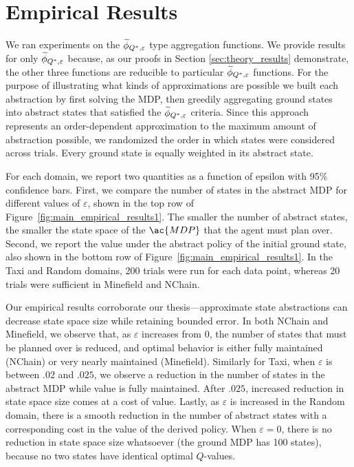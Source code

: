 \section{Empirical Results}

We ran experiments on the $\widetilde \phi_{Q^*,\varepsilon}$ type aggregation functions. We provide results for only $\widetilde \phi_{Q^*,\varepsilon}$ because, as our proofs in Section \ref{sec:theory_results} demonstrate, the other three functions are reducible to particular $\widetilde \phi_{Q^*,\varepsilon}$ functions. For the purpose of illustrating what kinds of approximations are possible we built each abstraction by first solving the MDP, then greedily aggregating ground states into abstract states that satisfied the $\widetilde \phi_{Q^*,\varepsilon}$ criteria. Since this approach represents an order-dependent approximation to the maximum amount of abstraction possible, we randomized the order in which states were considered across trials. Every ground state is equally weighted in its abstract state.

For each domain, we report two quantities as a function of epsilon with 95\% confidence bars. First, we compare the number of states in the abstract \ac{MDP} for different values of $\varepsilon$, shown in the top row of Figure~\ref{fig:main_empirical_results1}. The smaller the number of abstract states, the smaller the state space of the $\ac{MDP}$ that the agent must plan over. Second, we report the value under the abstract policy of the initial ground state, also shown in the bottom row of Figure~\ref{fig:main_empirical_results1}. In the Taxi and Random domains, 200 trials were run for each data point, whereas 20 trials were sufficient in Minefield and NChain.



Our empirical results corroborate our thesis---approximate state abstractions can decrease state space size while retaining bounded error. In both NChain and Minefield, we observe that, as $\varepsilon$ increases from $0$, the number of states that must be planned over is reduced, and optimal behavior is either fully maintained (NChain) or very nearly maintained (Minefield). Similarly for Taxi, when $\varepsilon$ is between $.02$ and $.025$, we observe a reduction in the number of states in the abstract \ac{MDP} while value is fully maintained. After $.025$, increased reduction in state space size comes at a cost of value. Lastly, as $\varepsilon$ is increased in the Random domain, there is a smooth reduction in the number of abstract states with a corresponding cost in the value of the derived policy. When $\varepsilon = 0$, there is no reduction in state space size whatsoever (the ground \ac{MDP} has 100 states), because no two states have identical optimal $Q$-values.


